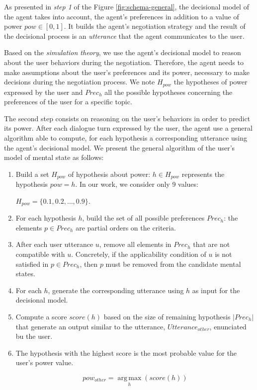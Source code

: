 \documentclass[sigconf]{aamas}  %
\begin{document}
		As presented in \textit{step 1} of the Figure \ref{fig:schema-general}, the decisional model of the agent takes into account, the agent's preferences in addition to a value of power $pow \in  [0,1]$. It builds the agent's negotiation strategy and the result of the decisional process is an \emph{utterance} that the agent communicates to the user. 
		
	
		Based on the \emph{simulation theory}, we use the agent's decisional model to reason about the user behaviors during the negotiation.
		Therefore, the agent needs to make assumptions about the user's preferences and its power, necessary to make decisions during the negotiation process.
		We note $H_{pow}$ the hypotheses of power expressed by the user and $Prec_h$ all the possible hypotheses concerning the preferences of the user for a specific topic. 
		
		The second step consists on reasoning on the user's behaviors in order to predict its power. After each dialogue turn expressed by the user, the agent use a general algorithm able to compute, for each hypothesis a corresponding utterance using the agent's decisional model. 
		We present the general algorithm of the user's model of mental state as follows:
	
		\begin{enumerate}
			\item Build a set $H_{pow}$ of hypothesis about power: $h\in H_{pow}$ represents the hypothesis $pow=h$. In our work, we consider only 9 values: 
			
			$H_{pow}=\{0.1, 0.2, \ldots, 0.9\}$.
			\item For each hypothesis $h$, build the set of all possible preferences $Prec_h$: the elements $p\in Prec_h$ are partial orders on the criteria.
			\item After each user utterance $u$, remove all elements in $Prec_h$ that are not compatible with $u$. Concretely, if the applicability condition of $u$ is not satisfied in $p\in Prec_h$, then $p$ must be removed from the candidate mental states.
			\item For each $h$, generate the corresponding utterance using $h$ as input for the decisional model.
			\item Compute a score $score(h)$ based on the size of remaining hypothesis $|Prec_h|$ that generate an output similar to the utterance, $Utterance_{other}$, enunciated bu the user. 
			\item 	The hypothesis with the highest score is the most probable value for the user's power value.
			
			\begin{equation}
			pow_{other} = \operatorname*{arg\,max}_{h} (score(h))
			\end{equation}
			
		\end{enumerate}
		
\end{document}
